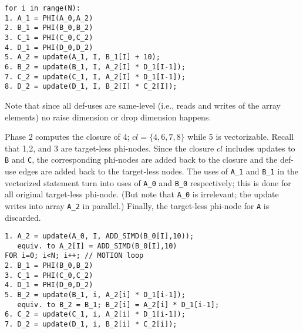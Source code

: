 {\small
\begin{verbatim}
for i in range(N):
1. A_1 = PHI(A_0,A_2)
2. B_1 = PHI(B_0,B_2)
3. C_1 = PHI(C_0,C_2)
4. D_1 = PHI(D_0,D_2)
5. A_2 = update(A_1, I, B_1[I] + 10);
6. B_2 = update(B_1, I, A_2[I] * D_1[I-1]);
7. C_2 = update(C_1, I, A_2[I] * D_1[I-1]);
8. D_2 = update(D_1, I, B_2[I] * C_2[I]);
\end{verbatim}
}

Note that since all def-uses are same-level (i.e., reads and writes of the array elements)
no raise dimension or drop dimension happens.

Phase 2 computes the closure of 4; $cl = \{4,6,7, 8\}$
while 5 is vectorizable. Recall that 1,2, and 3 are target-less phi-nodes. Since the closure $cl$ includes updates to \texttt{B} and \texttt{C},
the corresponding phi-nodes are added back to the closure and the def-use edges are added back to the target-less nodes. The uses of \texttt{A\_1} and \texttt{B\_1} in the vectorized statement
turn into uses of \texttt{A\_0} and \texttt{B\_0} respectively; this is done for all original target-less phi-node. (But note that \texttt{A\_0} is irrelevant; the update writes into array \texttt{A\_2} in parallel.)
Finally, the target-less phi-node for \texttt{A} is discarded.

{\small
\begin{verbatim}
1. A_2 = update(A_0, I, ADD_SIMD(B_0[I],10));
   equiv. to A_2[I] = ADD_SIMD(B_0[I],10)
FOR i=0; i<N; i++; // MOTION loop
2. B_1 = PHI(B_0,B_2)
3. C_1 = PHI(C_0,C_2)
4. D_1 = PHI(D_0,D_2)
5. B_2 = update(B_1, i, A_2[i] * D_1[i-1]);
   equiv. to B_2 = B_1; B_2[i] = A_2[i] * D_1[i-1];
6. C_2 = update(C_1, i, A_2[i] * D_1[i-1]);
7. D_2 = update(D_1, i, B_2[i] * C_2[i]);
\end{verbatim}
}



\begin{comment}
\begin{algorithmic}
\STATE 1. $\texttt{A}_2 = update(\texttt{A}_0; \stackrel{\rightarrow}{i}, \mathit{ADD\_SIMD}(\texttt{B}_0[\stackrel{\rightarrow}i],[10,...])$ \COMMENT{Fully vectorized, size N.}
\STATE FOR i=0; i<N; i++; \COMMENT{ MOTION loop }
\STATE 2. $\texttt{B}_1$ = $\phi(\texttt{B}_0,\texttt{B}_2)$
\STATE 3. $\texttt{C}_1$ = $\phi(\texttt{C}_0,\texttt{C}_2)$
\STATE 4. $\texttt{D}_1$ = $\phi(\texttt{D}_0,\texttt{D}_2)$
\STATE 5. $\texttt{B}_2 = update(\texttt{B}_1, i, \mathit{MUL}(\texttt{A}_2[i], \texttt{D}_1[{i-1}])$
\STATE 6. $\texttt{C}_2 = update(\texttt{C}_1, i, \mathit{MUL}(\texttt{A}_2[i], \texttt{D}_1[{i-1}])$
\STATE 7. $\texttt{D}_2 = update(\texttt{D}_1, i, \mathit{MUL}(\texttt{B}_2[i], \texttt{C}_1[i])$
\end{algorithmic}
\end{comment}

